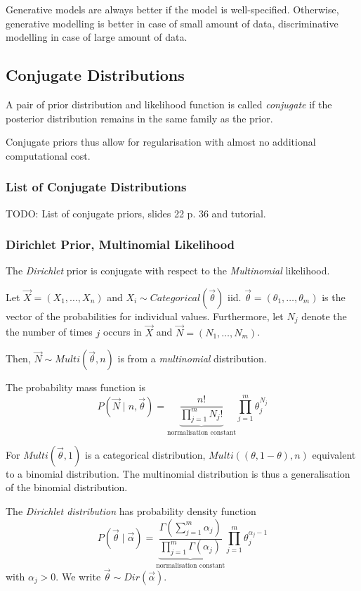 Generative models are always better if
the model is well-specified.
Otherwise, generative modelling is
better in case of small amount of data,
discriminative modelling in
case of large amount of data.


\subsection{Conjugate Distributions}
A pair of prior distribution and likelihood function
is called \emph{conjugate} if
the posterior distribution remains in
the same family as the prior.

Conjugate priors thus allow for regularisation
with almost no additional computational cost.

\subsubsection{List of Conjugate Distributions}
TODO: List of conjugate priors, slides 22 p. 36 and tutorial.

\subsubsection{Dirichlet Prior, Multinomial Likelihood}
The \emph{Dirichlet} prior is conjugate with
respect to the \emph{Multinomial} likelihood.

Let $\vec{X} = (X_1, \dotsc, X_n)$ and
$X_i \sim Categorical(\vec{\theta})$ iid.
$\vec{\theta} = (\theta_1, \dotsc, \theta_m)$
is the vector of the probabilities for
individual values.
Furthermore, let $N_j$ denote the
the number of times $j$ occurs in $\vec{X}$
and $\vec{N} = (N_1, \dotsc, N_m)$.

Then, $\vec{N} \sim Multi(\vec{\theta}, n)$
is from a \emph{multinomial} distribution.

The probability mass function is
\begin{equation*}
P(\vec{N} \mid n, \vec{\theta}) =
\underbrace{\frac{n!}{\prod_{j=1}^m{N_j!}}}_\text{normalisation constant}
\prod_{j=1}^m{\theta_j^{N_j}}
\end{equation*}

For $Multi(\vec{\theta}, 1)$ is a categorical
distribution,
$Multi((\theta, 1 - \theta), n)$ equivalent to a binomial distribution.
The multinomial distribution is thus a
generalisation of the binomial distribution.

The \emph{Dirichlet distribution} has probability density function
\begin{equation*}
P(\vec{\theta} \mid \vec{\alpha}) =
\underbrace{\frac{\Gamma(\sum_{j=1}^m{\alpha_j})}{\prod_{j=1}^m{\Gamma(\alpha_j)}}}_\text{normalisation constant}
\prod_{j=1}^m{\theta_j^{\alpha_j - 1}}
\end{equation*}
with $\alpha_j > 0$.
We write $\vec{\theta} \sim Dir(\vec{\alpha})$.

